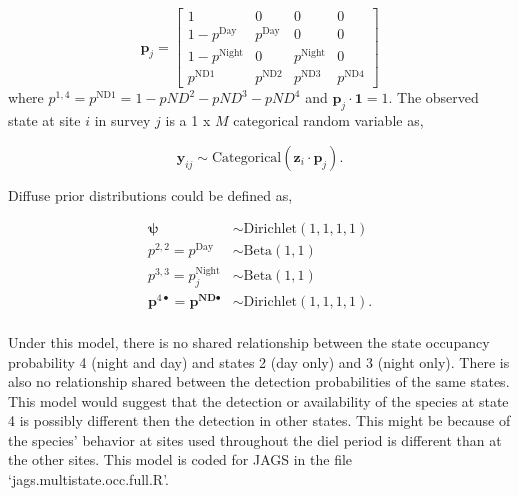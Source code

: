 \documentclass[12pt]{article}
\begin{document}
\begin{equation}
\boldsymbol{p}_{j} = \begin{bmatrix} 1 & 0 & 0 & 0 \\ 
									1-p^{\text{Day}} & p^{\text{Day}} & 0 & 0 \\ 
									1-p^{\text{Night}} & 0 & p^{\text{Night}} & 0\\
  								      p^{\text{ND1}} & p^{\text{ND2}} & p^{\text{ND3}} & p^{\text{ND4}}
  								      \end{bmatrix}
\end{equation}
where $p^{1,4} = p^{\text{ND1}} = 1-pND^{2} - pND^{3} -pND^{4}$ and $\boldsymbol{p}_{j} \cdot \boldsymbol{1} = 1$. The observed state at site $i$ in survey $j$ is a 1 x $M$ categorical random variable as,

\begin{equation}
\textbf{y}_{ij} \sim \text{Categorical}(\textbf{z}_{i} \cdot \boldsymbol{p}_{j}).
\end{equation}

Diffuse prior distributions could be defined as,
\begin{center}
\begin{align*}
\boldsymbol{\psi} &\sim \text{Dirichlet}(1,1,1,1)\\
p^{2,2}= p^{\text{Day}} &\sim \text{Beta}(1,1)\\
p^{3,3} = p_{j}^{\text{Night}}  &\sim \text{Beta}(1,1)\\
\boldsymbol{p}^{4 \bullet} = \boldsymbol{p^{\text{ND}\bullet}} &\sim \text{Dirichlet}(1,1,1,1).\\
\end{align*}
\end{center}

Under this model, there is no shared relationship between the state occupancy probability 4 (night and day) and states 2 (day only) and 3 (night only). There is also no relationship shared between the detection probabilities of the same states. This model would suggest that the detection or availability of the species at state 4 is possibly different then the detection in other states. This might be because of the species' behavior at sites used throughout the diel period is different than at the other sites. This model is coded for JAGS in the file `jags.multistate.occ.full.R'.
\end{document}
